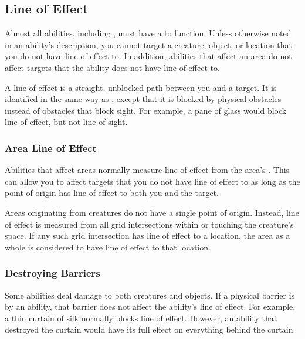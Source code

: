     \subsection{Line of Effect}\label{Line of Effect}

        Almost all abilities, including , must have a  to function.
        Unless otherwise noted in an ability's description, you cannot target a creature, object, or location that you do not have line of effect to.
        In addition, abilities that affect an area do not affect targets that the ability does not have line of effect to.

        A line of effect is a straight, unblocked path between you and a target.
        It is identified in the same way as , except that it is blocked by physical obstacles instead of obstacles that block sight.
        For example, a pane of glass would block line of effect, but not line of sight.

        \subsubsection{Area Line of Effect}\label{Area Line of Effect}
            Abilities that affect areas normally measure line of effect from the area's .
            This can allow you to affect targets that you do not have line of effect to as long as the point of origin has line of effect to both you and the target.

            Areas originating from creatures do not have a single point of origin.
            Instead, line of effect is measured from all grid intersections within or touching the creature's space.
            If any such grid intersection has line of effect to a location, the area as a whole is considered to have line of effect to that location.

        \subsubsection{Destroying Barriers}\label{Destroying Barriers}
            Some abilities deal damage to both creatures and objects.
            If a physical barrier is  by an ability, that barrier does not affect the ability's line of effect.
            For example, a thin curtain of silk normally blocks line of effect.
            However, an ability that destroyed the curtain would have its full effect on everything behind the curtain.


